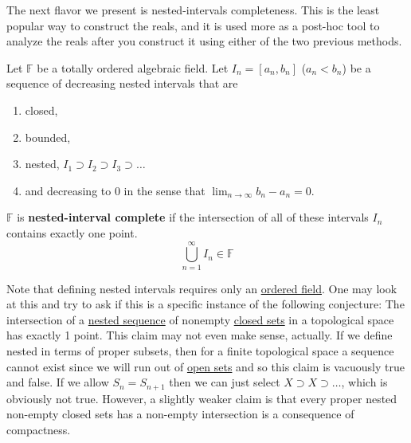   The next flavor we present is nested-intervals completeness.  This is the least popular way to construct the reals, and it is used more as a post-hoc tool to analyze the reals after you construct it using either of the two previous methods. 

  \begin{definition}
    \label{def:nested-interval-completeness}
    Let $\mathbb{F}$ be a totally ordered algebraic field. Let $I_n= [a_n, b_n]$ ($a_n < b_n$) be a sequence of decreasing nested intervals that are 
    \begin{enumerate}
      \item closed, 
      \item bounded, 
      \item nested, $I_1 \supset I_2 \supset I_3 \supset \ldots$ 
      \item and decreasing to $0$ in the sense that $\lim_{n \to \infty} b_n - a_n = 0$. 
    \end{enumerate}
    $\mathbb{F}$ is \textbf{nested-interval complete} if the intersection of all of these intervals $I_n$ contains exactly one point. 
    \begin{equation}
      \bigcup_{n=1}^\infty I_n \in \mathbb{F}
    \end{equation}
  \end{definition}

  Note that defining nested intervals requires only an \hyperref[alg-def:ordered-field]{ordered field}. One may look at this and try to ask if this is a specific instance of the following conjecture: The intersection of a \hyperref[pst-thm:nested-sequence-theorem]{nested sequence} of nonempty \hyperref[pst-def:closed]{closed sets} in a topological space has exactly 1 point. This claim may not even make sense, actually. If we define nested in terms of proper subsets, then for a finite topological space a sequence cannot exist since we will run out of \hyperref[pst-def:open-set]{open sets} and so this claim is vacuously true and false. If we allow $S_n = S_{n+1}$ then we can just select $X \supset X \supset \ldots$, which is obviously not true. However, a slightly weaker claim is that every proper nested non-empty closed sets has a non-empty intersection is a consequence of compactness. 

